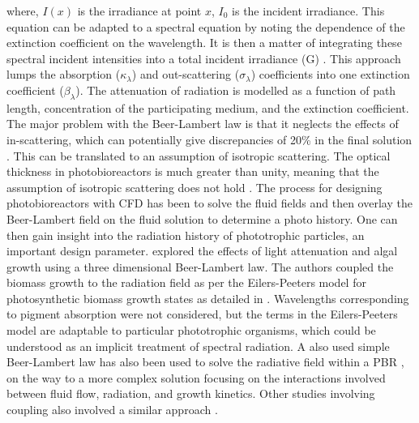 where, $I(x)$ is the irradiance at point $x$, $I_0$ is the incident irradiance. This equation can be adapted to a spectral equation by noting the dependence of the extinction coefficient on the wavelength. It is then a matter of integrating these spectral incident intensities into a total incident irradiance (G) \cite{pottier2005}.
\skippingparagraph
This approach lumps the absorption ($\kappa_\lambda$) and out-scattering ($\sigma_\lambda$) coefficients into one extinction coefficient ($\beta_\lambda$). The attenuation of radiation is modelled as a function of path length, concentration of the participating medium, and the extinction coefficient. The major problem with the Beer-Lambert law is that it neglects the effects of in-scattering, which can potentially give discrepancies of 20\% in the final solution \cite{berberoglu2007,pottier2005,wang2014a}. This can be translated to an assumption of isotropic scattering. The optical thickness in photobioreactors is much greater than unity, meaning that the assumption of isotropic scattering does not hold \cite{modest2003}.
\skippingparagraph
The process for designing photobioreactors with CFD has been to solve the fluid fields and then overlay the Beer-Lambert field on the fluid solution to determine a photo history. One can then gain insight into the radiation history of phototrophic particles, an important design parameter. \cite{marshall2010} explored the effects of light attenuation and algal growth using a three dimensional Beer-Lambert law. The authors coupled the biomass growth to the radiation field as per the Eilers-Peeters model for photosynthetic biomass growth states as detailed in \cite{bechet2013}. Wavelengths corresponding to pigment absorption were not considered, but the terms in the Eilers-Peeters model are adaptable to particular phototrophic organisms, which could be understood as an implicit treatment of spectral radiation. A  also used simple Beer-Lambert law has also been used to solve the radiative field within a PBR \cite{nauha2013}, on the way to a more complex solution focusing on the interactions involved between fluid flow, radiation, and growth kinetics. Other studies involving coupling also involved a similar approach \cite{marshall2011}. 
\skippingparagraph
